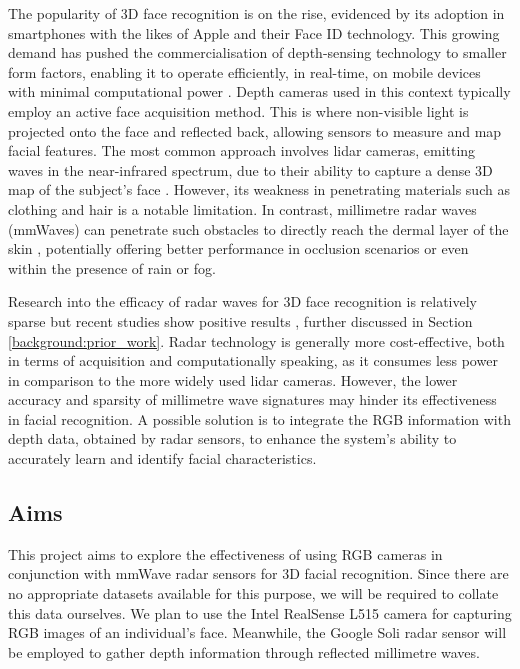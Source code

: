 \documentclass{interim}
\begin{document}
The popularity of 3D face recognition is on the rise, evidenced by its adoption in smartphones with the likes of Apple and their Face ID \cite{apple-faceid} technology. This growing demand has pushed the commercialisation of depth-sensing technology to smaller form factors, enabling it to operate efficiently, in real-time, on mobile devices with minimal computational power \cite{soumya2023recent}. Depth cameras used in this context typically employ an active face acquisition method. This is where non-visible light is projected onto the face and reflected back, allowing sensors to measure and map facial features. The most common approach involves lidar cameras, emitting waves in the near-infrared spectrum, due to their ability to capture a dense 3D map of the subject's face \cite{wang2020evolution}. However, its weakness in penetrating materials such as clothing and hair is a notable limitation. In contrast, millimetre radar waves (mmWaves) can penetrate such obstacles to directly reach the dermal layer of the skin \cite{vizard2006advances}, potentially offering better performance in occlusion scenarios or even within the presence of rain or fog.

Research into the efficacy of radar waves for 3D face recognition is relatively sparse but recent studies show positive results \cite{hof2020face, lim2020dnn,kim2020face, pho2021radar,challa2021face}, further discussed in Section \ref{background:prior_work}. Radar technology is generally more cost-effective, both in terms of acquisition and computationally speaking, as it consumes less power in comparison to the more widely used lidar cameras. However, the lower accuracy and sparsity of millimetre wave signatures may hinder its effectiveness in facial recognition. A possible solution is to integrate the RGB information with depth data, obtained by radar sensors, to enhance the system's ability to accurately learn and identify facial characteristics.


\subsection{Aims}
This project aims to explore the effectiveness of using RGB cameras in conjunction with mmWave radar sensors for 3D facial recognition. Since there are no appropriate datasets available for this purpose, we will be required to collate this data ourselves. We plan to use the Intel RealSense L515 camera \cite{intel-l515} for capturing RGB images of an individual's face. Meanwhile, the Google Soli radar sensor \cite{lien2016soli} will be employed to gather depth information through reflected millimetre waves.
\end{document}
